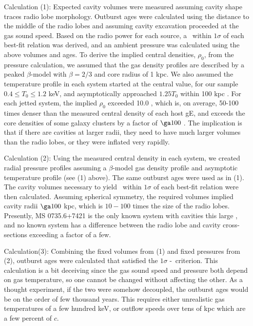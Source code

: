 \documentclass{emulateapj}
\begin{document}
Calculation (1): Expected cavity volumes were measured assuming cavity
shape traces radio lobe morphology. Outburst ages were calculated
using the distance to the middle of the radio lobes and assuming
cavity excavation proceeded at the gas sound speed. Based on the radio
power for each source, a \pcav\ within $1\sigma$ of each best-fit
relation was derived, and an ambient pressure was calculated using the
above volumes and ages. To derive the implied central densities,
$\rho_0$, from the pressure calculation, we assumed that the gas
density profiles are described by a peaked $\beta$-model
\citep{betamodel} with $\beta = 2/3$ \citep{1984ApJ...276...38J} and
core radius of 1 kpc. We also assumed the temperature profile in each
system started at the central value, for our sample $0.4 \le T_0 \le
1.2$ keV, and asymptotically approached $1.25T_0$ within 100 kpc
\citep{2008ApJ...680..897D}. For each jetted system, the implied
$\rho_0$ exceeded 10.0 \pcc, which is, on average, 50-100 times denser
than the measured central density of each host gE, and exceeds the
core densities of some galaxy clusters by a factor of $\ga 100$
\citep{2004ApJ...613..180S, 2007ApJ...664..162M, 2008MNRAS.385.1186S,
  accept}. The implication is that if there are cavities at larger
radii, they need to have much larger volumes than the radio lobes, or
they were inflated very rapidly.

Calculation (2): Using the measured central density in each system, we
created radial pressure profiles assuming a $\beta$-model gas density
profile and asymptotic temperature profile (see (1) above). The same
outburst ages were used as in (1). The cavity volumes necessary to
yield \pcav\ within $1\sigma$ of each best-fit relation were then
calculated. Assuming spherical symmetry, the required volumes implied
cavity radii $\ga 100$ kpc, which is $10-100$ times the size of the
radio lobes. Presently, MS 0735.6+7421 is the only known system with
cavities this large \citep{ms0735}, and no known system has a
difference between the radio lobe and cavity cross-sections exceeding
a factor of a few.

Calculation(3): Combining the fixed volumes from (1) and fixed
pressures from (2), outburst ages were calculated that satisfied the
$1\sigma$ \pcav-\prad\ criterion. This calculation is a bit deceiving
since the gas sound speed and pressure both depend on gas temperature,
so one cannot be changed without affecting the other. As a thought
experiment, if the two were somehow decoupled, the outburst ages would
be on the order of few thousand years. This requires either
unrealistic gas temperatures of a few hundred keV, or outflow speeds
over tens of kpc which are a few percent of $c$.
\end{document}
